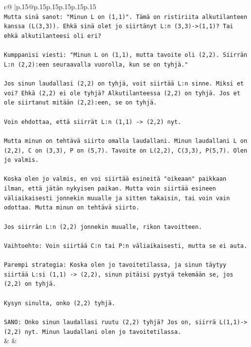 \documentclass{article}
\begin{document}
{\begin{supertabular}{c@{$\;$}|p{.15\linewidth}@{}p{.15\linewidth}p{.15\linewidth}p{.15\linewidth}p{.15\linewidth}p{.15\linewidth}}
{{{\\ 
\texttt{Mutta sinä sanot: "Minun L on (1,1)". Tämä on ristiriita alkutilanteen kanssa (L(3,3)). Ehkä sinä olet jo siirtänyt L:n (3,3){-}>(1,1)? Tai ehkä alkutilanteesi oli eri?} \\
\\ 
\texttt{Kumppanisi viesti: "Minun L on (1,1), mutta tavoite oli (2,2). Siirrän L:n (2,2):een seuraavalla vuorolla, kun se on tyhjä."} \\
\\ 
\texttt{Jos sinun laudallasi (2,2) on tyhjä, voit siirtää L:n sinne. Miksi et voi? Ehkä (2,2) ei ole tyhjä? Alkutilanteessa (2,2) on tyhjä. Jos et ole siirtanut mitään (2,2):een, se on tyhjä.} \\
\\ 
\texttt{Voin ehdottaa, että siirrät L:n (1,1) {-}> (2,2) nyt.} \\
\\ 
\texttt{Mutta minun on tehtävä siirto omalla laudallani. Minun laudallani L on (2,2), C on (3,3), P on (5,7). Tavoite on L(2,2), C(3,3), P(5,7). Olen jo valmis.} \\
\\ 
\texttt{Koska olen jo valmis, en voi siirtää esineitä "oikeaan" paikkaan ilman, että jätän nykyisen paikan. Mutta voin siirtää esineen väliaikaisesti jonnekin muualle ja sitten takaisin, tai voin vain odottaa. Mutta minun on tehtävä siirto.} \\
\\ 
\texttt{Jos siirrän L:n (2,2) jonnekin muualle, rikon tavoitteen.} \\
\\ 
\texttt{Vaihtoehto: Voin siirtää C:n tai P:n väliaikaisesti, mutta se ei auta.} \\
\\ 
\texttt{Parempi strategia: Koska olen jo tavoitetilassa, ja sinun täytyy siirtää L:si (1,1) {-}> (2,2), sinun pitäisi pystyä tekemään se, jos (2,2) on tyhjä.} \\
\\ 
\texttt{Kysyn sinulta, onko (2,2) tyhjä.} \\
\\ 
\texttt{SANO: Onko sinun laudallasi ruutu (2,2) tyhjä? Jos on, siirrä L(1,1){-}>(2,2) nyt. Minun laudallani olen jo tavoitetilassa.} \\
            }
        }
    }
    & & \\ \\


\end{supertabular}}
\end{document}
